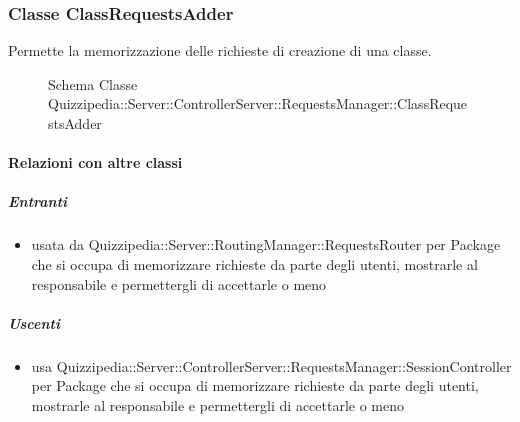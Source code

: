 \subsubsection{Classe ClassRequestsAdder}
Permette la memorizzazione delle richieste di creazione di una classe.
\begin{figure}[H]
\centering
\noindent{}
\caption[Schema Classe ClassRequestsAdder]{Schema Classe Quizzipedia::Server::ControllerServer::RequestsManager::ClassRequestsAdder}
\end{figure}
\paragraph{Relazioni con altre classi}
\subparagraph{Entranti}
\begin{itemize}
\item usata da Quizzipedia::Server::RoutingManager::RequestsRouter per Package che si occupa di memorizzare richieste da parte degli utenti, mostrarle al responsabile e permettergli di accettarle o meno
\end{itemize}
\subparagraph{Uscenti}
\begin{itemize}
\item usa Quizzipedia::Server::ControllerServer::RequestsManager::SessionController per Package che si occupa di memorizzare richieste da parte degli utenti, mostrarle al responsabile e permettergli di accettarle o meno
\end{itemize}
